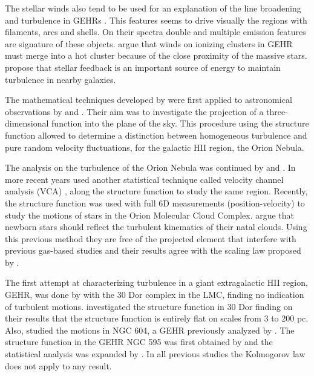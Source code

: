 \documentclass[fleqn,usenatbib]{mnras}
\begin{document}
The stellar winds also tend to be used for an explanation of the line broadening and turbulence in GEHRs \citep{1994ApJ...425..720C}. This features seems to drive visually the regions with filaments, arcs and shells. On their spectra double and multiple emission features are signature of these objects. \cite{2020MNRAS.494...97S} argue that winds on ionizing clusters in GEHR must merge into a hot cluster because of the close proximity of the massive stars. \cite{2019ApJ...871...17U} propose that stellar feedback is an important source of energy to maintain turbulence in nearby galaxies.


The mathematical techniques developed by \citet{kolm1,1948ZPhy..124..628H} were first applied to astronomical observations by \citet{von1951methode} and \citet{munch1958internal}. Their aim was to investigate the projection of a three-dimensional function into the plane of the sky. This procedure using the structure function allowed to determine a distinction between homogeneous turbulence and pure random velocity fluctuations, for the galactic HII region, the Orion Nebula.

The analysis on the turbulence of the Orion Nebula was continued by \citet{castaneda1988} and \citet{1992ApJ...387..229O}. In more recent years \cite{arthur2016turbulence} used another statistical technique called velocity channel analysis (VCA) \citep{2000ApJ...537..720L}, along the structure function to study the same region. Recently, the structure function was used with full 6D measurements (position-velocity) to study the motions of stars in the Orion Molecular Cloud Complex. \cite{2021ApJ...907L..40H} argue that newborn stars should reflect the turbulent kinematics of their natal clouds. Using this previous method they are free of the projected element that interfere with previous gas-based studies and their results agree with the scaling law proposed by \cite{1981MNRAS.194..809L}.  

The first attempt at characterizing turbulence in a giant extragalactic HII region, GEHR, was done by \citet{1961MNRAS.122....1F} with the 30 Dor complex in the LMC, finding no indication of turbulent motions. \cite{2019arXiv191203543M} investigated the structure function in 30 Dor finding on their results that the structure function is entirely flat on scales from 3 to 200 pc. Also, \cite{2019arXiv191203543M} studied the motions in NGC 604, a GEHR previously analyzed by \cite{tanco1997}. The structure function in the GEHR NGC 595 was first obtained by \cite{lagrois2009multi} and the statistical analysis was expanded by \cite{lagrois2011}. In all previous studies the Kolmogorov law does not apply to any result.
\end{document}
